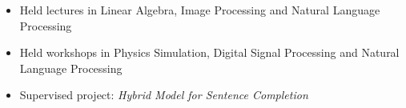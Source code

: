 \documentclass[10pt,a4paper]{source/altacv}
\begin{document}
\divider



\begin{itemize}
    \item   \small{Held lectures in Linear Algebra, Image Processing and Natural Language Processing}
    \item   \small{Held workshops in Physics Simulation, Digital Signal Processing and Natural Language Processing}
    \item   \small{Supervised project: \textit{Hybrid Model for Sentence Completion}}
    \\
    \smallskip
    \smallskip
       
\end{itemize}

\medskip





\end{document}
